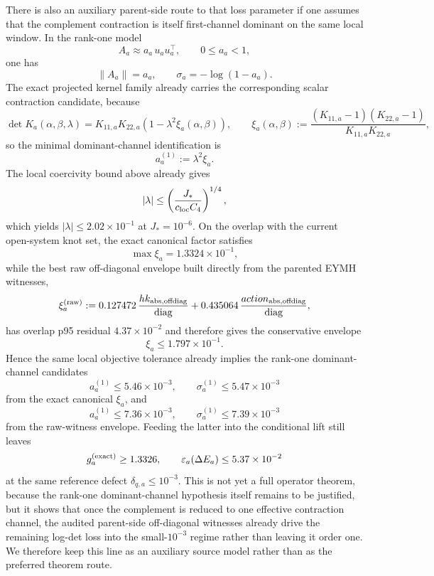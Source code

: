 \documentclass[aps,prd,onecolumn,notitlepage,nofootinbib,superscriptaddress,11pt,floatfix]{revtex4-2}
\begin{document}
There is also an auxiliary parent-side route to that loss parameter if one assumes that the complement contraction is itself first-channel dominant on the same local window. In the rank-one model
\[
A_a \approx a_a\,u_a u_a^\top,
\qquad
0\le a_a<1,
\]
one has
\[
\|A_a\|=a_a,
\qquad
\sigma_a=-\log(1-a_a).
\]
The exact projected kernel family already carries the corresponding scalar contraction candidate, because
\[
\det K_a(\alpha,\beta,\lambda)
=
K_{11,a}K_{22,a}\left(1-\lambda^2\xi_a(\alpha,\beta)\right),
\qquad
\xi_a(\alpha,\beta):=
\frac{(K_{11,a}-1)(K_{22,a}-1)}{K_{11,a}K_{22,a}},
\]
so the minimal dominant-channel identification is
\[
a_a^{(1)}:=\lambda^2\xi_a.
\]
The local coercivity bound above already gives
\[
|\lambda|
\le
\left(\frac{J_\ast}{c_{\rm loc}C_4}\right)^{1/4},
\]
which yields $|\lambda|\le 2.02\times10^{-1}$ at $J_\ast=10^{-6}$. On the overlap with the current open-system knot set, the exact canonical factor satisfies
\[
\max \xi_a = 1.3324\times10^{-1},
\]
while the best raw off-diagonal envelope built directly from the parented EYMH witnesses,
\[
\xi_a^{\rm(raw)}
:=
0.127472\,\frac{hk_{\rm abs,offdiag}}{\mathrm{diag}}
+
0.435064\,\frac{action_{\rm abs,offdiag}}{\mathrm{diag}},
\]
has overlap p95 residual $4.37\times10^{-2}$ and therefore gives the conservative envelope
\[
\xi_a\le 1.797\times10^{-1}.
\]
Hence the same local objective tolerance already implies the rank-one dominant-channel candidates
\[
a_a^{(1)}\le 5.46\times10^{-3},
\qquad
\sigma_a^{(1)}\le 5.47\times10^{-3}
\]
from the exact canonical $\xi_a$, and
\[
a_a^{(1)}\le 7.36\times10^{-3},
\qquad
\sigma_a^{(1)}\le 7.39\times10^{-3}
\]
from the raw-witness envelope. Feeding the latter into the conditional lift still leaves
\[
g_a^{\rm(exact)}\ge 1.3326,
\qquad
\varepsilon_a(\Delta E_a)\le 5.37\times10^{-2}
\]
at the same reference defect $\delta_{q,a}\le 10^{-3}$. This is not yet a full operator theorem, because the rank-one dominant-channel hypothesis itself remains to be justified, but it shows that once the complement is reduced to one effective contraction channel, the audited parent-side off-diagonal witnesses already drive the remaining log-det loss into the small-$10^{-3}$ regime rather than leaving it order one. We therefore keep this line as an auxiliary source model rather than as the preferred theorem route.
\end{document}
